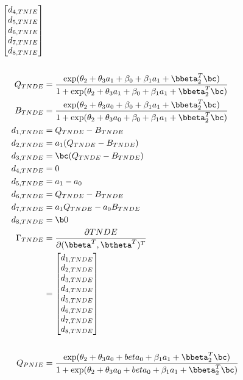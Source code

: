 \documentclass[dvipdfmx,10pt]{article}
\begin{document}
\begin{align*}
\begin{bmatrix}
      d_{4,TNIE}\\
      d_{5,TNIE}\\
      d_{6,TNIE}\\
      d_{7,TNIE}\\
      d_{8,TNIE}\\
    \end{bmatrix}\\
  \\
  Q_{TNDE} &= \frac
             {    \exp(\theta_{2} + \theta_{3}a_{1} + \beta_{0} + \beta_{1}a_{1} + \bbeta_{2}^{T}\bc)}
             {1 + \exp(\theta_{2} + \theta_{3}a_{1} + \beta_{0} + \beta_{1}a_{1} + \bbeta_{2}^{T}\bc)}\\
  B_{TNDE} &= \frac
             {    \exp(\theta_{2} + \theta_{3}a_{0} + \beta_{0} + \beta_{1}a_{1} + \bbeta_{2}^{T}\bc)}
             {1 + \exp(\theta_{2} + \theta_{3}a_{0} + \beta_{0} + \beta_{1}a_{1} + \bbeta_{2}^{T}\bc)}\\
      d_{1,TNDE} &= Q_{TNDE} - B_{TNDE}\\
      d_{2,TNDE} &= a_{1} (Q_{TNDE} - B_{TNDE})\\
      d_{3,TNDE} &= \bc (Q_{TNDE} - B_{TNDE})\\
      d_{4,TNDE} &= 0\\
      d_{5,TNDE} &= a_{1} - a_{0}\\
      d_{6,TNDE} &= Q_{TNDE} - B_{TNDE}\\
      d_{7,TNDE} &= a_{1}Q_{TNDE} - a_{0}B_{TNDE}\\
      d_{8,TNDE} &= \b0\\
  \Gamma_{TNDE}
  &= \frac{\partial TNDE}{\partial (\bbeta^{T},\btheta^{T})^{T}}\\
  &= \begin{bmatrix}
      d_{1,TNDE}\\
      d_{2,TNDE}\\
      d_{3,TNDE}\\
      d_{4,TNDE}\\
      d_{5,TNDE}\\
      d_{6,TNDE}\\
      d_{7,TNDE}\\
      d_{8,TNDE}\\
    \end{bmatrix}\\
  \\
  Q_{PNIE} &= \frac
      {    \exp(\theta_{2} + \theta_{3}a_{0} + beta_{0} + \beta_{1}a_{1} + \bbeta_{2}^{T}\bc)}
      {1 + \exp(\theta_{2} + \theta_{3}a_{0} + beta_{0} + \beta_{1}a_{1} + \bbeta_{2}^{T}\bc)}\\

\end{align*}
\end{document}
